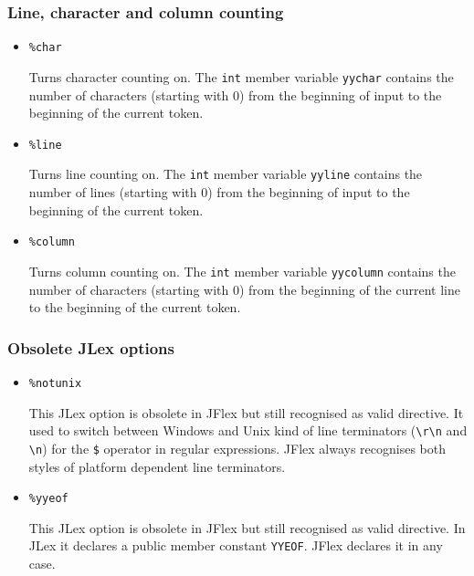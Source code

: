 \subsubsection{Line, character and column
counting}\label{line-character-and-column-counting}

\begin{itemize}
\item
  \texttt{\%char}

  Turns character counting on. The \texttt{int} member variable
  \texttt{yychar} contains the number of characters (starting with 0)
  from the beginning of input to the beginning of the current token.
\item
  \texttt{\%line}

  Turns line counting on. The \texttt{int} member variable
  \texttt{yyline} contains the number of lines (starting with 0) from
  the beginning of input to the beginning of the current token.
\item
  \texttt{\%column}

  Turns column counting on. The \texttt{int} member variable
  \texttt{yycolumn} contains the number of characters (starting with 0)
  from the beginning of the current line to the beginning of the current
  token.
\end{itemize}

\subsubsection{Obsolete JLex options}\label{obsolete-jlex-options}

\begin{itemize}
\item
  \texttt{\%notunix}

  This JLex option is obsolete in JFlex but still recognised as valid
  directive. It used to switch between Windows and Unix kind of line
  terminators (\texttt{\textbackslash{}r\textbackslash{}n} and
  \texttt{\textbackslash{}n}) for the \texttt{\$} operator in regular
  expressions. JFlex always recognises both styles of platform dependent
  line terminators.
\item
  \texttt{\%yyeof}

  This JLex option is obsolete in JFlex but still recognised as valid
  directive. In JLex it declares a public member constant
  \texttt{YYEOF}. JFlex declares it in any case.
\end{itemize}


